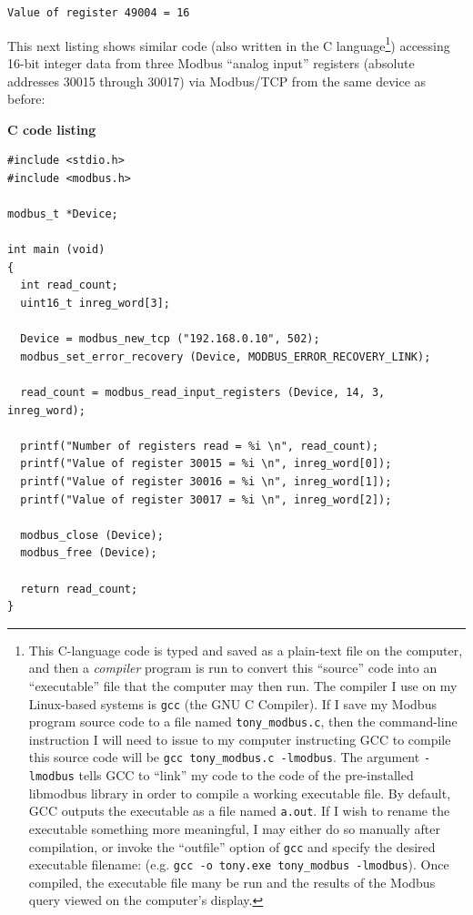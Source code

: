 \texttt{Value of register 49004 = 16}

\filbreak

This next listing shows similar code (also written in the C language\footnote{This C-language code is typed and saved as a plain-text file on the computer, and then a \textit{compiler} program is run to convert this ``source'' code into an ``executable'' file that the computer may then run.  The compiler I use on my Linux-based systems is \texttt{gcc} (the GNU C Compiler).  If I save my Modbus program source code to a file named \texttt{tony\_modbus.c}, then the command-line instruction I will need to issue to my computer instructing GCC to compile this source code will be \texttt{gcc tony\_modbus.c -lmodbus}.  The argument \texttt{-lmodbus} tells GCC to ``link'' my code to the code of the pre-installed libmodbus library in order to compile a working executable file.  By default, GCC outputs the executable as a file named \texttt{a.out}.  If I wish to rename the executable something more meaningful, I may either do so manually after compilation, or invoke the ``outfile'' option of \texttt{gcc} and specify the desired executable filename: (e.g. \texttt{gcc -o tony.exe tony\_modbus -lmodbus}).  Once compiled, the executable file many be run and the results of the Modbus query viewed on the computer's display.}) accessing 16-bit integer data from three Modbus ``analog input'' registers (absolute addresses 30015 through 30017) via Modbus/TCP from the same device as before:

\vskip 10pt

\textbf{C code listing} 

\lstset{language=C}
\begin{lstlisting}
#include <stdio.h>
#include <modbus.h>

modbus_t *Device;

int main (void)
{
  int read_count;
  uint16_t inreg_word[3];

  Device = modbus_new_tcp ("192.168.0.10", 502);
  modbus_set_error_recovery (Device, MODBUS_ERROR_RECOVERY_LINK);

  read_count = modbus_read_input_registers (Device, 14, 3, inreg_word);

  printf("Number of registers read = %i \n", read_count);
  printf("Value of register 30015 = %i \n", inreg_word[0]);
  printf("Value of register 30016 = %i \n", inreg_word[1]);
  printf("Value of register 30017 = %i \n", inreg_word[2]);

  modbus_close (Device);
  modbus_free (Device);

  return read_count;
}
\end{lstlisting}

